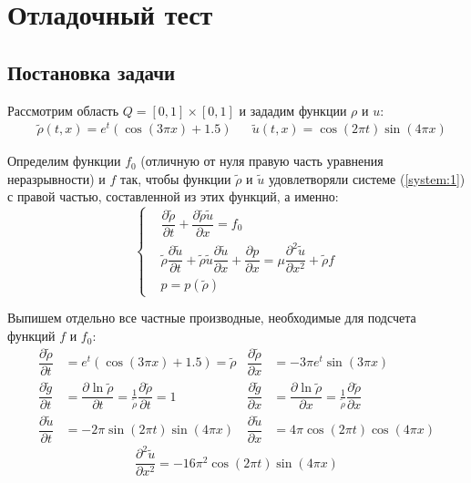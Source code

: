 \section{Отладочный тест}
\subsection{Постановка задачи}
Рассмотрим область $Q = [0,1] \times[0, 1]$ и зададим функции $\rho$ и $u$:
\begin{align}
\label{debug_f}
& \tilde{\rho}(t, x) = e^{t} (\cos(3 \pi x) + 1.5) &
& \tilde{u}(t, x) = \cos(2 \pi t) \sin(4 \pi x)
\end{align}

Определим функции $f_{0}$ (отличную от нуля правую часть уравнения неразрывности) и $f$ так, чтобы функции $\tilde{\rho}$ и $\tilde{u}$ удовлетворяли системе (\ref{system:1}) с правой частью, составленной из этих функций, а именно:
\begin{equation*}
\left\{
 \begin{aligned}
  & \dfrac{\partial \tilde{\rho}}{\partial t} 
    + \dfrac{\partial \tilde{\rho} \tilde{u}}{\partial x} 
    = f_0 \\
  & \tilde{\rho} \dfrac{\partial \tilde{u}}{\partial t} 
    + \tilde{\rho} \tilde{u} \dfrac{\partial \tilde{u}}{\partial x} 
    + \dfrac {\partial p} {\partial x} 
    = \mu \dfrac{\partial^{2} \tilde{u}}{\partial x ^{2}} 
    + \tilde{\rho} f \\
  & p = p(\tilde{\rho})
 \end{aligned}
\right.
\end{equation*}

Выпишем отдельно все частные производные, необходимые для подсчета функций $f$ и $f_{0}$:
\begin{align*}
  \dfrac{\partial \tilde{\rho}}{\partial t}
    &= e^{t} (\cos(3 \pi x) + 1.5) = \tilde{\rho}
  & \dfrac{\partial \tilde{\rho}}{\partial x}
    &= - 3\pi e^{t} \sin(3 \pi x) \\
  \dfrac{\partial \tilde{g}}{\partial t} 
    &= \dfrac{\partial \ln \tilde{\rho}}{\partial t}
     = \frac{1}{\tilde{\rho}} \dfrac{\partial \tilde{\rho}}{\partial t} = 1 
  & \dfrac{\partial \tilde{g}}{\partial x} 
    &= \dfrac{\partial \ln \tilde{\rho}}{\partial x}
     = \frac{1}{\tilde{\rho}} \dfrac{\partial \tilde{\rho}}{\partial x} \\
  \dfrac{\partial \tilde{u}}{\partial t}
    &= -2\pi \sin(2 \pi t) \sin(4 \pi x) 
  & \dfrac{\partial \tilde{u}}{\partial x}
    &=  4\pi \cos(2 \pi t) \cos(4 \pi x)
\end{align*}
\begin{equation*}
  \dfrac{\partial^{2} \tilde{u}}{\partial x^2}
    = -16\pi^2 \cos(2 \pi t) \sin(4 \pi x)
\end{equation*}

